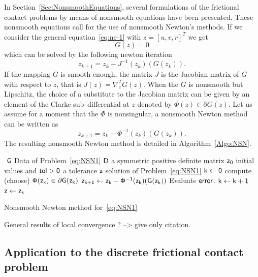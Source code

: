 In Section~\ref{Sec:NonsmoothEquations}, several formulations of the frictional contact problems by means of nonsmooth equations  have been presented. These nonsmooth equations call for the use of nonsmooth Newton's methods. If we consider the general equation~\eqref{eq:ne-1} with $z = [u,v,r]^T$ we get
\begin{equation}
  \label{eq:NSN1}
  G(z)=0
\end{equation}
which can be solved by the following newton iteration
\begin{equation}
  \label{eq:NSN2}
  z_{k+1}  =  z_k -  J^{-1}(z_k) (G(z_k)).
\end{equation}
If the mapping $G$ is smooth enough, the matrix $J$ is the Jacobian matrix of $G$ with respect to $z$, that is $J(z) = \nabla^T_z G(z)$. When the $G$ is nonsmooth but Lipschitz,  the choice of a substitute to the Jacobian matrix can be given by an element of the Clarke sub--differential at $z$ denoted by $ \Phi(z) \in \partial G(z)$. Let us assume for a moment that the $\Phi$ is nonsingular, a nonsmooth Newton method can be written as 
\begin{equation}
  \label{eq:NSN3}
  z_{k+1}  =  z_k -  \Phi^{-1}(z_k) (G(z_k)).
\end{equation}
The resulting nonsmooth Newton method is detailed in Algorithm~\ref{Algo:NSN}.
\begin{algorithm}
  \begin{algorithmic}
    {\sf
      \STATE $ $
      \REQUIRE $\sf G $ Data of Problem~\eqref{eq:NSN1}
      \REQUIRE $\sf D$ a symmetric positive definite matrix
      \REQUIRE $\sf z_0$ initial values and $\sf tol >0$ a tolerance
      \ENSURE  $\sf z$ solution of Problem~\eqref{eq:NSN1}
      \STATE   $\sf k \leftarrow 0$ 
      \STATE compute (choose) $\sf \Phi(z_k) \in \partial G(z_k)$
      \STATE $\sf z_{k+1} \leftarrow   z_k -  \Phi^{-1}(z_k) (G(z_k))$
      \STATE Evaluate $\sf error$.
      \STATE $\sf k \leftarrow k+1$
      \ENDWHILE
      \STATE $\sf z \leftarrow z_{k}$ 
    }
  \end{algorithmic}
  \caption{Nonsmooth Newton method for~\eqref{eq:NSN1}}  \label{Algo:NSN}
\end{algorithm}

\begin{ndrva}
  General results of local convergence ? --> give only citation.
\end{ndrva}
\subsection{Application to  the discrete frictional contact problem}


